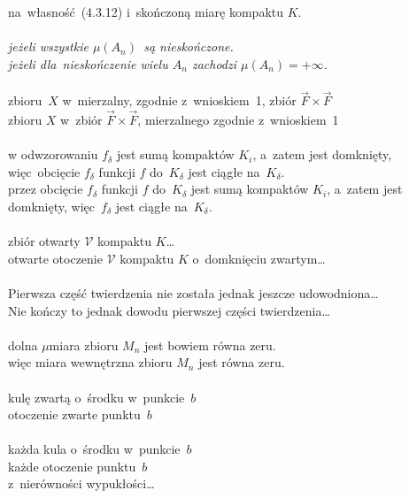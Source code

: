 \documentclass[a4paper,11pt]{article}
\begin{document}
na~własność~(4.3.12) i~skończoną miarę kompaktu $K$. \\
 \\
\Jest \textit{jeżeli wszystkie $\mu( A_{ n } )$~są nieskończone.} \\
\Powin \textit{jeżeli dla~nieskończenie wielu $A_{ n }$ zachodzi
  $\mu( A_{ n } ) = +\infty$.} \\
 \\
\Jest zbioru~$X$ w~mierzalny, zgodnie z~wnioskiem~1,
zbiór $\vec{ F } \times \vec{ F }$ \\
\Powin zbioru $X$ w~zbiór $\vec{ F } \times \vec{ F }$, mierzalnego
zgodnie
z~wnioskiem~1 \\
 \\
\Jest w odwzorowaniu $f_{ \delta }$ jest sumą kompaktów $K_{ i }$,
a~zatem jest domknięty, więc~obcięcie $f_{ \delta }$ funkcji $f$
do~$K_{ \delta }$
jest ciągłe na~$K_{ \delta }$. \\
\Powin przez obcięcie $f_{ \delta }$ funkcji $f$ do~$K_{ \delta }$
jest sumą kompaktów $K_{ i }$, a~zatem jest domknięty,
więc~$f_{ \delta }$
jest ciągłe na~$K_{ \delta }$. \\
 \\
\Jest zbiór otwarty $\mathcal{V}$ kompaktu $K$\ldots \\
\Powin otwarte otoczenie $\mathcal{V}$ kompaktu $K$ o~domknięciu
zwartym\ldots \\
 \\
\Jest Pierwsza część twierdzenia nie została jednak jeszcze
udowodniona\ldots \\
\Powin  Nie kończy to jednak dowodu pierwszej części twierdzenia\ldots \\
 \\
\Jest dolna $\mu$\dywiz miara zbioru $M_{ n }$ jest bowiem równa zeru. \\
\Powin  więc miara wewnętrzna zbioru $M_{ n }$ jest równa zeru. \\
 \\
\Jest kulę zwartą o~środku w~punkcie~$b$ \\
\Powin  otoczenie zwarte punktu~$b$ \\
 \\
\Jest każda kula o~środku w~punkcie~$b$ \\
\Powin każde otoczenie punktu~$b$
 \\
\Jest z~nierówności wypukłości\ldots\\
\end{document}
